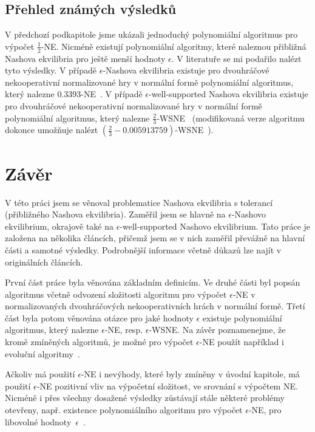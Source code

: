 \documentclass[a4paper,12pt]{article}
\begin{document}
\subsection{Přehled známých výsledků}
V předchozí podkapitole jsme ukázali jednoduchý polynomiální algoritmus pro výpočet $\frac{1}{2}$-NE.
Nicméně existují polynomiální algoritmy, které naleznou přibližná Nashova ekvilibria pro ještě menší hodnoty $\epsilon$. V literatuře se mi podařilo nalézt tyto 
výs\-ledky. V případě $\epsilon$-Nashova ekvilibria existuje pro dvouhráčové nekooperativní normalizované hry
v normální formě polynomiální algoritmus, který nalezne $0.3393$-NE~\cite{Tsaknakis2007}. V případě $\epsilon$-well-supported Nashova ekvilibria existuje pro dvouhráčové nekooperativní normalizované hry
v normální formě polynomiální algoritmus, který nalezne $\frac{2}{3}$-WSNE~\cite{Kontogiannis:2010:WSA:1773434.1773437} (modifikovaná 
verze algoritmu dokonce umožňuje nalézt $(\frac{2}{3} - 0.005913759)$-WSNE~\cite{DBLP:journals/corr/abs-1204-0707}).


\section{Závěr}
V této práci jsem se věnoval problematice Nashova ekvilibria s tolerancí (přibližného Nashova ekvilibria). Zaměřil jsem se hlavně na $\epsilon$-Nashovo ekvilibrium, 
okrajově také na $\epsilon$-well-supported Nashovo ekvilibrium. Tato práce je založena na několika článcích, přičemž jsem se v nich zaměřil převážně na hlavní části
a samotné výsledky. Podrobnější informace včetně důkazů lze najít v originálních článcích. 

První část práce byla věnována základním definicím. Ve druhé části byl popsán algoritmus včetně odvození složitosti algoritmu pro výpočet $\epsilon$-NE v 
normalizovaných dvouhráčových nekooperativních hrách v normální formě. Třetí část byla potom věnována otázce pro jaké hodnoty $\epsilon$ existuje 
polynomiální algoritmus, který nalezne $\epsilon$-NE, resp. $\epsilon$-WSNE.
Na závěr poznamenejme, že kromě zmíněných algoritmů, je možné pro výpočet $\epsilon$-NE použít například i evoluční algoritmy~\cite{Boryczka2013}.

Ačkoliv má použití $\epsilon$-NE i nevýhody, které byly zmíněny v úvodní kapitole, má použití $\epsilon$-NE pozitivní vliv na výpočetní 
složitost, ve srovnání s výpočtem NE. Nicméně i přes všechny dosažené výsledky zůstávají stále některé problémy otevřeny, např. existence
polynomiálního algoritmu pro výpočet $\epsilon$-NE, pro libovolné hodnoty~$\epsilon$~\cite{Nisan:2007:AGT:1296179}.


{}
\end{document}
